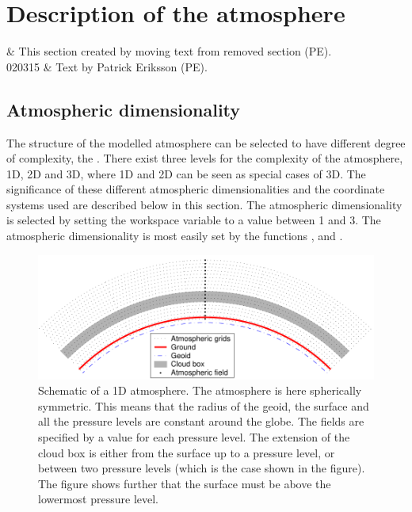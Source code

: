 \chapter{Description of the atmosphere}
 \label{sec:atmosphere}

 & This section created by moving text from removed section (PE).\\ 
 020315 & Text by Patrick Eriksson (PE).\\
\stophistory

\graphicspath{{Figs/atmosphere/}}


\section{Atmospheric dimensionality}
\label{sec:fm_defs:atmdim}

The structure of the modelled atmosphere can be selected to have
different degree of complexity, the . There exist three levels for the complexity of the
atmosphere, 1D, 2D and 3D, where 1D and 2D can be seen as special
cases of 3D. The significance of these different atmospheric
dimensionalities and the coordinate systems used are described below
in this section. The atmospheric dimensionality is selected by setting
the workspace variable  to a value between 1
and 3. The atmospheric dimensionality is most easily set by the
functions ,  and
.

\begin{figure}[!t]
 \begin{center}
  \includegraphics*[width=0.98\hsize]{atm_dim_1d}
  \caption{Schematic of a 1D atmosphere. The atmosphere is 
    here spherically symmetric. This means that the radius of the
    geoid, the surface and all the pressure levels are constant
    around the globe. The fields are specified by a value for each
    pressure level. The extension of the cloud box is either from
    the surface up to a pressure level, or between two pressure
    levels (which is the case shown in the figure). The figure shows
    further that the surface must be above the lowermost pressure
    level. }
  \label{fig:fm_defs:1d}  
 \end{center}
\end{figure}

